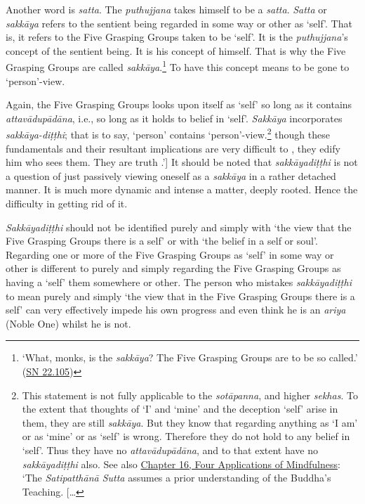 Another word is \emph{satta}. The \emph{puthujjana} takes himself to be a \emph{satta}. \emph{Satta} or \emph{sakkāya} refers to the sentient being regarded in some way or other as `self'. That is, it refers to the Five Grasping Groups taken to be `self'. It is the \emph{puthujjana}'s concept of the sentient being. It is his concept of himself. That is why the Five Grasping Groups are called \emph{sakkāya}.\footnote{`What, monks, is the \emph{sakkāya}? The Five Grasping Groups are to be so called.' (\href{https://suttacentral.net/sn22.105/en/sujato}{SN 22.105})} To have this concept means to be gone to `person'-view.

Again, the Five Grasping Groups looks upon itself as `self' so long as it contains \emph{attavādupādāna}, i.e., so long as it holds to belief in `self'. \emph{Sakkāya} incorporates \emph{sakkāya-diṭṭhi}; that is to say, `person' contains `person'-view.\footnote{This statement is not fully applicable to the \emph{sotāpanna}, and higher \emph{sekhas}. To the extent that thoughts of `I' and `mine' and the deception `self' arise in them, they are still \emph{sakkāya}. But they know that regarding anything as `I am' or as `mine' or as `self' is wrong. Therefore they do not hold to any belief in `self'. Thus they have no \emph{attavādupādāna}, and to that extent have no \emph{sakkāyadiṭṭhi} also. See also \href{ch-16-satipatthana.xml\#truth-for-him}{Chapter 16, Four Applications of Mindfulness}: `The \emph{Satipatthānā Sutta} assumes a prior understanding of the Buddha's Teaching. {[}\ldots\hspace{0pt}} though these fundamentals and their resultant implications are very difficult to , they edify him who sees them. They are truth .'{]} It should be noted that \emph{sakkāyadiṭṭhi} is not a question of just passively viewing oneself as a \emph{sakkāya} in a rather detached manner. It is much more dynamic and intense a matter, deeply rooted. Hence the difficulty in getting rid of it.

\emph{Sakkāyadiṭṭhi} should not be identified purely and simply with `the view that  the Five Grasping Groups there is a self' or with `the belief in a self or soul'. Regarding one or more of the Five Grasping Groups as `self' in some way or other is different to purely and simply regarding the Five Grasping Groups as having a `self'  them somewhere or other. The person who mistakes \emph{sakkāyadiṭṭhi} to mean purely and simply `the view that in the Five Grasping Groups there is a self' can very effectively impede his own progress and even think he is an \emph{ariya} (Noble One) whilst he is not.

